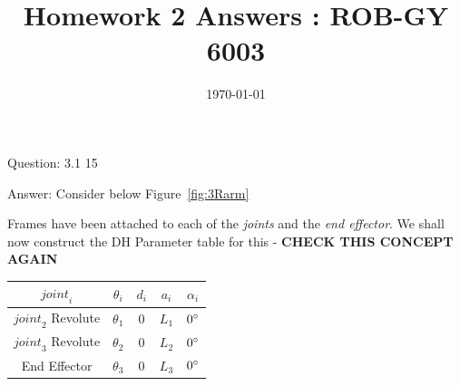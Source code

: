 \documentclass[a4paper]{article}
\title{Homework 2 Answers : ROB-GY 6003}
\author{\myName}
\date{\today}
\newcommand{\myName}{\textbf{Shantanu Ghodgaonkar}\\\textit{Univ ID}: N11344563\\\textit{Net ID}: sng8399\\\textit{Ph.No.}: +1 (929) 922-0614}
\begin{document}
	
	\begin{titlepage}
	\end{titlepage}
	
	\begin{qalist}			
		\item[Question: 3.1] \setcounter{equation}{0} 15
		\item[Answer:] Consider below Figure~\ref{fig:3Rarm} \\
			\begin{minipage}{\linewidth}
				\vspace{0.5cm}
				\centering
				\label{fig:3Rarm}
				\vspace{0.5cm}
			\end{minipage}
			Frames have been attached to each of the \textit{joints} and the \textit{end effector}. 
			We shall now construct the DH Parameter table for this - \textbf{CHECK THIS CONCEPT AGAIN} \\
			\begin{minipage}{\linewidth}
				\vspace{0.5cm}
				\centering
				\begin{tabular}{|c|c|c|c|c|}
					\hline
					${joint}_{i}$ & ${\theta}_{i}$ & ${d}_{i}$ & ${a}_{i}$ & ${\alpha}_{i}$\\
					\hline \hline
					${joint}_{2}$ Revolute & ${\theta}_{1}$ & $0$ & ${L}_{1}$ & $0 \degree$\\
					\hline
					${joint}_{3}$ Revolute & ${\theta}_{2}$ & $0$ & ${L}_{2}$ & $0\degree$\\
					\hline
					End Effector & ${\theta}_{3}$ & $0$ & ${L}_{3}$ & $0 \degree$\\
					\hline
				\end{tabular}
				\vspace{0.5cm}
			\end{minipage}	
			

\end{qalist}
\end{document}
